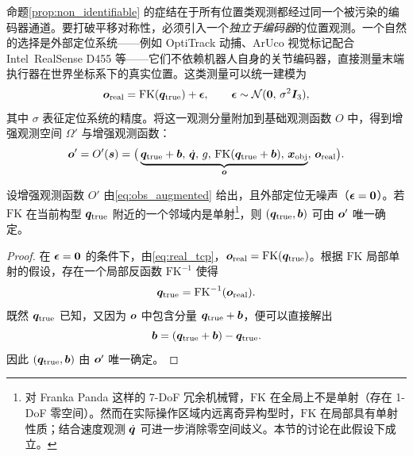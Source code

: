 命题\ref{prop:non_identifiable} 的症结在于所有位置类观测都经过同一个被污染的编码器通道。要打破平移对称性，必须引入一个\emph{独立于编码器}的位置观测。一个自然的选择是外部定位系统——例如 OptiTrack 动捕、ArUco 视觉标记配合 Intel~RealSense D455 等——它们不依赖机器人自身的关节编码器，直接测量末端执行器在世界坐标系下的真实位置。这类测量可以统一建模为
\begin{equation}
  \bm{o}_{\text{real}} = \text{FK}(\bm{q}_{\text{true}}) + \bm{\epsilon}, \qquad \bm{\epsilon} \sim \mathcal{N}(\bm{0},\,\sigma^2 \bm{I}_3),
  \label{eq:real_tcp}
\end{equation}
其中 $\sigma$ 表征定位系统的精度。将这一观测分量附加到基础观测函数 $O$ 中，得到增强观测空间 $\Omega'$ 与增强观测函数：
\begin{equation}
  \bm{o}' = O'(\bm{s}) = \big(\underbrace{\bm{q}_{\text{true}} + \bm{b},\,\dot{\bm{q}},\,g,\,\text{FK}(\bm{q}_{\text{true}} + \bm{b}),\,\bm{x}_{\text{obj}}}_{\bm{o}},\,\bm{o}_{\text{real}}\big).
  \label{eq:obs_augmented}
\end{equation}

\begin{proposition}[增强观测下的可辨识性]\label{prop:identifiable}
设增强观测函数 $O'$ 由\cref{eq:obs_augmented} 给出，且外部定位无噪声（$\bm{\epsilon} = \bm{0}$）。若 $\text{FK}$ 在当前构型 $\bm{q}_{\text{true}}$ 附近的一个邻域内是单射\footnote{对 Franka Panda 这样的 7-DoF 冗余机械臂，$\text{FK}$ 在全局上不是单射（存在 1-DoF 零空间）。然而在实际操作区域内远离奇异构型时，$\text{FK}$ 在局部具有单射性质；结合速度观测 $\dot{\bm{q}}$ 可进一步消除零空间歧义。本节的讨论在此假设下成立。}，则 $(\bm{q}_{\text{true}}, \bm{b})$ 可由 $\bm{o}'$ 唯一确定。
\end{proposition}

\begin{proof}
在 $\bm{\epsilon} = \bm{0}$ 的条件下，由\cref{eq:real_tcp}，$\bm{o}_{\text{real}} = \text{FK}(\bm{q}_{\text{true}})$。根据 $\text{FK}$ 局部单射的假设，存在一个局部反函数 $\text{FK}^{-1}$ 使得
\begin{equation}
  \bm{q}_{\text{true}} = \text{FK}^{-1}(\bm{o}_{\text{real}}).
  \label{eq:recover_q}
\end{equation}
既然 $\bm{q}_{\text{true}}$ 已知，又因为 $\bm{o}$ 中包含分量 $\bm{q}_{\text{true}} + \bm{b}$，便可以直接解出
\begin{equation}
  \bm{b} = (\bm{q}_{\text{true}} + \bm{b}) - \bm{q}_{\text{true}}.
  \label{eq:recover_b}
\end{equation}
因此 $(\bm{q}_{\text{true}}, \bm{b})$ 由 $\bm{o}'$ 唯一确定。\end{proof}


